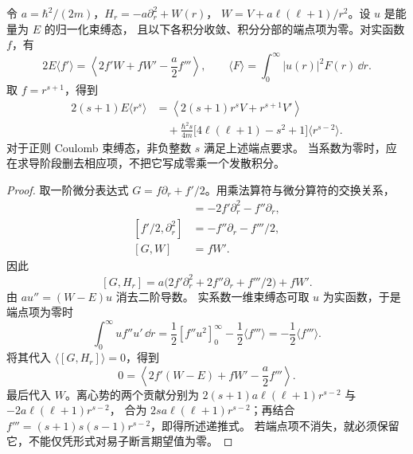 \begin{proposition}[径向超位力恒等式]
令 $a=\hbar^2/(2m)$，$H_r=-a\partial_r^2+W(r)$，
$W=V+a\ell(\ell+1)/r^2$。设 $u$ 是能量为 $E$ 的归一化束缚态，
且以下各积分收敛、积分分部的端点项为零。对实函数 $f$，有
\[
2E\langle f'\rangle
=\left\langle 2f'W+fW'-\frac a2 f'''\right\rangle,
\qquad \langle F\rangle=\int_0^\infty |u(r)|^2F(r)\,\dd r.
\]
取 $f=r^{s+1}$，得到
\begin{equation}\label{eq:phys-hdqm-hypervirial-recurrence}
\begin{aligned}
2(s+1)E\langle r^s\rangle
&=\left\langle 2(s+1)r^sV+r^{s+1}V'\right\rangle\\
&\quad+\frac{\hbar^2s}{4m}
\bigl[4\ell(\ell+1)-s^2+1\bigr]\langle r^{s-2}\rangle.
\end{aligned}
\end{equation}
对于正则 Coulomb 束缚态，非负整数 $s$ 满足上述端点要求。
当系数为零时，应在求导阶段删去相应项，不把它写成零乘一个发散积分。
\end{proposition}
\begin{proof}
取一阶微分表达式 $G=f\partial_r+f'/2$。用乘法算符与微分算符的交换关系，
\begin{align*}
[f\partial_r,\partial_r^2]&=-2f'\partial_r^2-f''\partial_r,\\
[f'/2,\partial_r^2]&=-f''\partial_r-f'''/2,\\
[G,W]&=fW'.
\end{align*}
因此
\[
[G,H_r]=a\bigl(2f'\partial_r^2+2f''\partial_r+f'''/2\bigr)+fW'.
\]
由 $a u''=(W-E)u$ 消去二阶导数。
实系数一维束缚态可取 $u$ 为实函数，于是端点项为零时
\[
\int_0^\infty u f''u'\,\dd r
=\frac12[f''u^2]_0^\infty-\frac12\langle f'''\rangle
=-\frac12\langle f'''\rangle.
\]
将其代入 $\langle[G,H_r]\rangle=0$，得到
\[
0=\left\langle 2f'(W-E)+fW'-\frac a2 f'''\right\rangle.
\]
最后代入 $W$。离心势的两个贡献分别为
$2(s+1)a\ell(\ell+1)r^{s-2}$ 与 $-2a\ell(\ell+1)r^{s-2}$，
合为 $2sa\ell(\ell+1)r^{s-2}$；再结合
$f'''=(s+1)s(s-1)r^{s-2}$，即得所述递推式。
若端点项不消失，就必须保留它，不能仅凭形式对易子断言期望值为零。
\end{proof}

